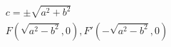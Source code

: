 \documentclass[preview]{standalone}
\begin{document}
\begin{align*}
c = \pm \sqrt{a^2 + b^2} \\ F(\sqrt{a^2-b^2}, 0), F'(-\sqrt{a^2-b^2}, 0)
\end{align*}
\end{document}
